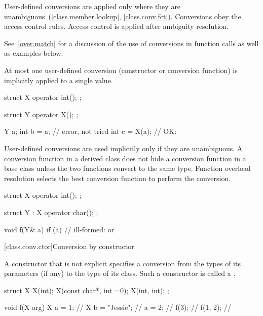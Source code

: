 \pnum
User-defined conversions are applied only where they are unambiguous~(\ref{class.member.lookup}, \ref{class.conv.fct}).
Conversions obey the access control rules.
Access control is applied after ambiguity resolution.

\pnum
\begin{note}
See~\ref{over.match} for a discussion of the use of conversions in function calls
as well as examples below.
\end{note}

\pnum
{}%
At most one user-defined conversion (constructor or conversion function)
is implicitly applied to a single value.
\begin{example}
\begin{codeblock}
struct X {
  operator int();
};

struct Y {
  operator X();
};

Y a;
int b = a;          // error,  not tried
int c = X(a);       // OK: 
\end{codeblock}
\end{example}

\pnum
User-defined conversions are used implicitly only if they are unambiguous.
%
A conversion function in a derived class does not hide a conversion function
in a base class unless the two functions convert to the same type.
Function overload resolution selects the best
conversion function to perform the conversion.
\begin{example}
\begin{codeblock}
struct X {
  operator int();
};

struct Y : X {
    operator char();
};

void f(Y& a) {
  if (a) {          // ill-formed:  or 
  }
}
\end{codeblock}
\end{example}

[class.conv.ctor]{Conversion by constructor}%
%

\pnum
A constructor that is not explicit
specifies a conversion from
the types of its parameters (if any)
to the type of its class.
Such a constructor is called a
.
\begin{example}
%
\begin{codeblock}
struct X {
    X(int);
    X(const char*, int =0);
    X(int, int);
};

void f(X arg) {
  X a = 1;          // 
  X b = "Jessie";   // 
  a = 2;            // 
  f(3);             // 
  f({1, 2});        // 
}
\end{codeblock}
\end{example}

